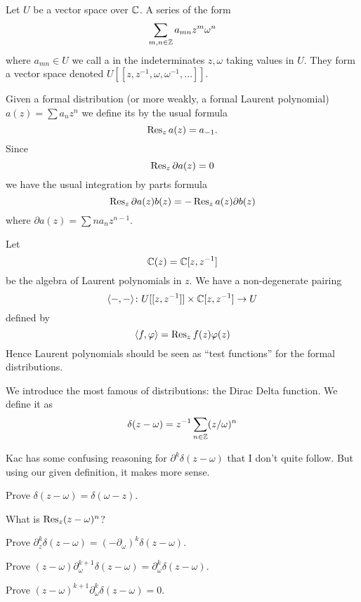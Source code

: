 \M
Let $U$ be a vector space over $\CC$. A series of the form
\begin{equation}
\sum_{m,n\in\ZZ}a_{mn}z^{m}\omega^{n}
\end{equation}
where $a_{mn}\in U$ we call a  in the
indeterminates $z,\omega$ taking values in $U$. They form a vector space
denoted $U[[z,z^{-1},\omega,\omega^{-1},\dots]]$. 

\M
Given a formal distribution (or more weakly, a formal Laurent polynomial)
$a(z) = \sum a_{n}z^{n}$ we define its  by the usual
formula
\begin{equation}
\Res[z]{a(z)} = a_{-1}.
\end{equation}
Since
\begin{equation}
\Res[z]{\partial a(z)}=0
\end{equation}
we have the usual integration by parts formula
\begin{equation}
\Res[z]{\partial a(z)b(z)}=-\Res[z]{a(z)\partial b(z)}
\end{equation}
where $\partial a(z)=\sum na_{n}z^{n-1}$.

\M
Let
\begin{equation}
\CC(z)=\CC[z,z^{-1}]
\end{equation}
be the algebra of Laurent polynomials in $z$. We have a non-degenerate
pairing
\begin{equation}
\<-,-\>\colon U[[z,z^{-1}]]\times\CC[z,z^{-1}]\to U
\end{equation}
defined by
\begin{equation}
\<f,\varphi\>=\Res[z]{f(z)\varphi(z)}
\end{equation}
Hence Laurent polynomials should be seen as ``test functions'' for the
formal distributions.

\M
We introduce the most famous of distributions: the Dirac Delta
function. We define it as
\begin{equation}
\delta(z-\omega)
=z^{-1}\sum_{n\in\ZZ}(z/\omega)^{n}
\end{equation}
\begin{rmk}
Kac has some confusing reasoning for $\partial^{k}\delta(z-\omega)$ that
I don't quite follow. But using our given definition, it makes more sense.
\end{rmk}

\begin{xca}
Prove $\delta(z-\omega)=\delta(\omega-z)$.
\end{xca}
\begin{xca}
What is $\Res[z]{(z-\omega)^{n}}$?
\end{xca}
\begin{xca}
Prove $\partial^{k}_{z}\delta(z-\omega)=(-\partial_{\omega})^{k}\delta(z-\omega)$.
\end{xca}
\begin{xca}\label{xca:deltaDerivative}%
Prove $(z-\omega)\partial^{k+1}_{\omega}\delta(z-\omega)=\partial^{k}_{\omega}\delta(z-\omega)$.
\end{xca}
\begin{xca}\label{xca:usefulForCor3}%
Prove $(z-\omega)^{k+1}\partial^{k}_{\omega}\delta(z-\omega)=0$.
\end{xca}

